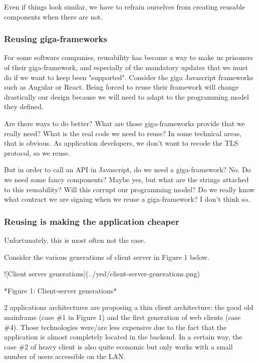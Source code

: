 \documentclass[]{article}
\begin{document}
Even if things look similar, we have to refrain ourselves from creating reusable components when there are not.

\subsubsection{Reusing giga-frameworks}

For some software companies, reusability has become a way to make us prisoners of their giga-framework, and especially of the mandatory updates that we must do if we want to keep been "supported". Consider the giga Javascript frameworks such as Angular or React. Being forced to reuse their framework will change drastically our design because we will need to adapt to the programming model they defined.

Are there ways to do better? What are those giga-frameworks provide that we really need? What is the real code we need to reuse? In some technical areas, that is obvious. As application developers, we don't want to recode the TLS protocol, so we reuse.

But in order to call an API in Javascript, do we need a giga-framework? No. Do we need some fancy components? Maybe yes, but what are the strings attached to this reusability? Will this corrupt our programming model? Do we really know what contract we are signing when we reuse a giga-framework? I don't think so.

\subsubsection{Reusing is making the application cheaper}

Unfortunately, this is most often not the case.

Consider the various generations of client server in Figure 1 below.

![Client server generations](../yed/client-server-generations.png)

*Figure 1: Client-server generations*

2 applications architectures are proposing a thin client architecture: the good old mainframe (case \#1 in Figure 1) and the first generation of web clients (case \#4). Those technologies were/are less expensive due to the fact that the application is almost completely located in the backend. In a certain way, the case \#2 of heavy client is also quite economic but only works with a small number of users accessible on the LAN.
\end{document}
